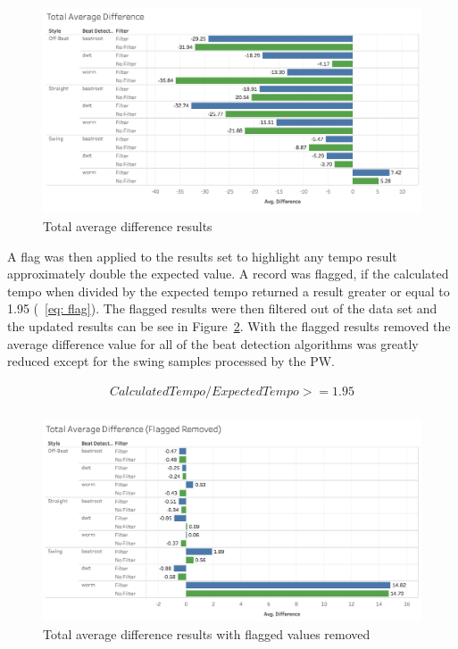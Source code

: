 \documentclass[a4paper, 11pt]{article}
\begin{document}
\begin{figure}[htbp]
\centering
\includegraphics[scale=0.25]{images/totAveDiff.jpg}
\caption{Total average difference results}
\label{fig: aveDiff}
\end{figure}

A flag was then applied to the results set to highlight any tempo result approximately double the expected value. A record was flagged, if the calculated tempo when divided by the expected tempo returned a result greater or equal to 1.95 (~\ref{eq: flag}). The flagged results were then filtered out of the data set and the updated results can be see in Figure~\ref{fig: upAveDiff}. With the flagged results removed the average difference value for all of the beat detection algorithms was greatly reduced except for the swing samples processed by the PW. 

\begin{equation}\label{eq: flag}
\begin{split}
Calculated Tempo/Expected Tempo >= 1.95\\
\end{split}
\end{equation}

\begin{figure}[htbp]
\centering
\includegraphics[scale=0.25]{images/totAveDiffFR.jpg}
\caption{Total average difference results with flagged values removed}
\label{fig: upAveDiff}
\end{figure}
\end{document}
